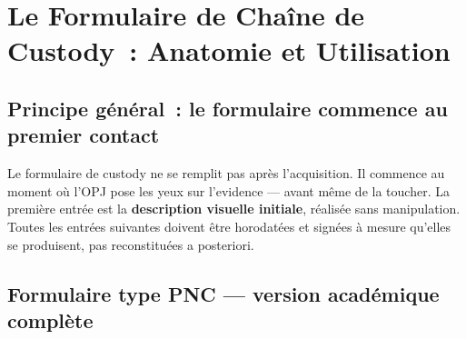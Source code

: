 \section{Le Formulaire de Chaîne de Custody~: Anatomie et Utilisation}
\label{sec:custody-formulaire}

\subsection{Principe général~: le formulaire commence au premier contact}

Le formulaire de custody ne se remplit pas après l'acquisition. Il commence
au moment où l'OPJ pose les yeux sur l'evidence --- avant même de la toucher.
La première entrée est la \textbf{description visuelle initiale}, réalisée
sans manipulation. Toutes les entrées suivantes doivent être horodatées et
signées à mesure qu'elles se produisent, pas reconstituées a posteriori.

\subsection{Formulaire type PNC --- version académique complète}

